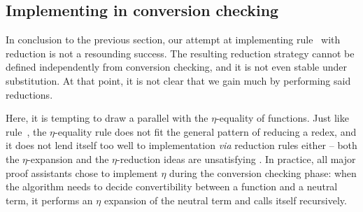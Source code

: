 \subsection{Implementing  in conversion checking}

In conclusion to the previous section, our attempt at implementing 
rule~ with reduction is not a resounding 
success.
% 
The resulting reduction strategy cannot be defined independently from 
conversion checking, and it is not even stable under substitution.
% 
At that point, it is not clear that we gain much by performing said reductions.

Here, it is tempting to draw a parallel with the \( \eta \)-equality of functions. 
% 
Just like rule~, the \( \eta \)-equality rule 
does not fit the general pattern of reducing a redex, and it does not lend 
itself too well to implementation \textit{via} reduction rules either -- both the
\( \eta \)-expansion and the \( \eta \)-reduction ideas are unsatisfying
.
% 
In practice, all major proof assistants chose to implement \( \eta \) during 
the conversion checking phase: when the algorithm needs to decide 
convertibility between a function and a neutral term, it performs an \( \eta \)
expansion of the neutral term and calls itself recursively.

